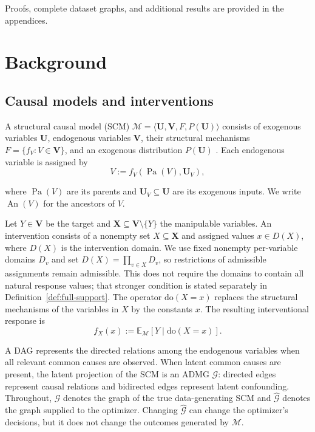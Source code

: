 \documentclass[twoside]{article}
\newcommand{\E}{\mathbb{E}}
\newcommand{\doo}{\mathrm{do}}
\newcommand{\Gg}{\mathcal{G}}
\begin{document}
 Proofs, complete dataset graphs, and additional results are provided in the appendices.

\section{Background}
\label{sec:setup}

\subsection{Causal models and interventions}

A structural causal model (SCM) \(\mathcal M=\langle\mathbf U,\mathbf V,F,P(\mathbf U)\rangle\) consists of exogenous variables \(\mathbf U\), endogenous variables \(\mathbf V\), their structural mechanisms \(F=\{f_V:V\in\mathbf V\}\), and an exogenous distribution \(P(\mathbf U)\) \citep{pearlCausality2009}. Each endogenous variable is assigned by 
 \[
 V:=f_V\!\left(\operatorname{Pa}(V),\mathbf U_V\right),
\]

where \(\operatorname{Pa}(V)\) are its parents and \(\mathbf U_V\subseteq\mathbf U\) are its exogenous inputs. We write \(\operatorname{An}(V)\) for the ancestors of \(V\).

Let \(Y\in\mathbf V\) be the target and $\mathbf X\subseteq\mathbf V\setminus\{Y\}$ the manipulable variables. An intervention consists of a nonempty set \(X\subseteq\mathbf X\) and assigned values \(x\in D(X)\), where \(D(X)\) is the intervention domain. We use fixed nonempty per-variable domains \(D_v\) and set \(D(X)=\prod_{v\in X}D_v\), so restrictions of admissible assignments remain admissible. This does not require the domains to contain all natural response values; that stronger condition is stated separately in Definition~\ref{def:full-support}. The operator \(\doo(X=x)\) replaces the structural mechanisms of the variables in \(X\) by the constants \(x\). The resulting interventional response is
\begin{equation}
f_X(x):=\E_{\mathcal M}[Y\mid\doo(X=x)].
\label{eq:arm-value}
\end{equation}

A DAG represents the directed relations among the endogenous variables when all relevant common causes are observed. When latent common causes are present, the latent projection of the SCM is an ADMG \(\Gg\): directed edges represent causal relations and bidirected edges represent latent confounding. Throughout, \(\Gg\) denotes the graph of the true data-generating SCM and \(\widehat{\Gg}\) denotes the graph supplied to the optimizer. Changing \(\widehat{\Gg}\) can change the optimizer's decisions, but it does not change the outcomes generated by \(\mathcal M\).
\end{document}
